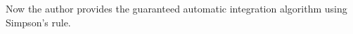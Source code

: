 \documentclass{iitthesis}
\theoremstyle{definition}
\theoremstyle{remark}
\begin{document}
%
%
%
Now the author provides the guaranteed automatic integration algorithm using Simpson's rule.
\end{document}

